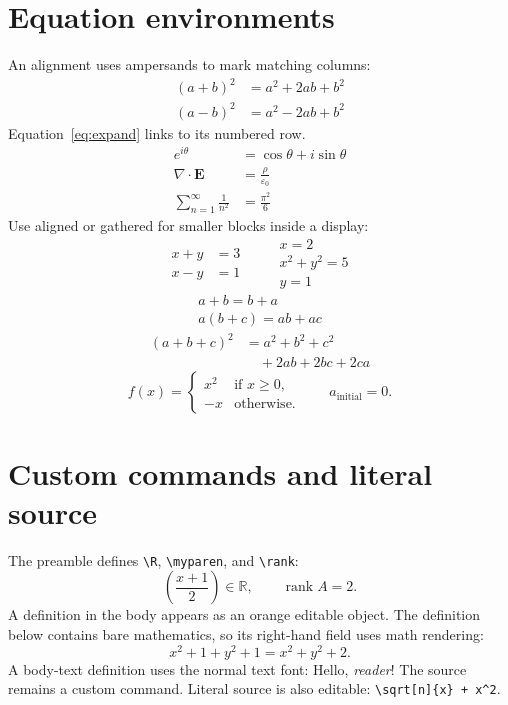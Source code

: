 \documentclass[12pt]{article}
\newcommand{\R}{\mathbb{R}}
\def\myparen#1{\left(#1\right)}
\DeclareMathOperator{\rank}{rank}
\begin{document}
\section{Equation environments}
An alignment uses ampersands to mark matching columns:
\begin{align}
 (a+b)^2&=a^2+2ab+b^2\label{eq:expand}\\
 (a-b)^2&=a^2-2ab+b^2
\end{align}
Equation~\eqref{eq:expand} links to its numbered row.
\begin{align*}
 e^{i\theta}&=\cos\theta+i\sin\theta\\
 \nabla\cdot\mathbf{E}&=\frac{\rho}{\varepsilon_0}\\
 \sum_{n=1}^{\infty}\frac{1}{n^2}&=\frac{\pi^2}{6}
\end{align*}
Use aligned or gathered for smaller blocks inside a display:
\[
 \begin{aligned}
  x+y&=3\\
  x-y&=1
 \end{aligned}
 \qquad
 \begin{gathered}
  x=2\\
  x^2+y^2=5\\
  y=1
 \end{gathered}
\]
\begin{gather}
 a+b=b+a\\
 a(b+c)=ab+ac
\end{gather}
\begin{equation}
 \begin{split}
  (a+b+c)^2&=a^2+b^2+c^2\\
           &\quad+2ab+2bc+2ca
 \end{split}
\end{equation}
\[
 f(x)=\begin{cases}
  x^2&\text{if }x\geq0,\\
  -x&\text{otherwise.}
 \end{cases}
 \qquad a_{\text{initial}}=0.
\]

\section{Custom commands and literal source}
The preamble defines \verb|\R|, \verb|\myparen|, and \verb|\rank|:
\[
 \myparen{\frac{x+1}{2}}\in\R,\qquad \rank A=2.
\]
A definition in the body appears as an orange editable object. The definition
below contains bare mathematics, so its right-hand field uses math rendering:
\newcommand{\squareplus}[1]{#1^2+1}
\[
 \squareplus{x}+\squareplus{y}=x^2+y^2+2.
\]
A body-text definition uses the normal text font:
\newcommand{\greeting}[1]{Hello, \textit{#1}!}
\greeting{reader} The source remains a custom command.
Literal source is also editable: \verb|\sqrt[n]{x} + x^2|.
\end{document}
